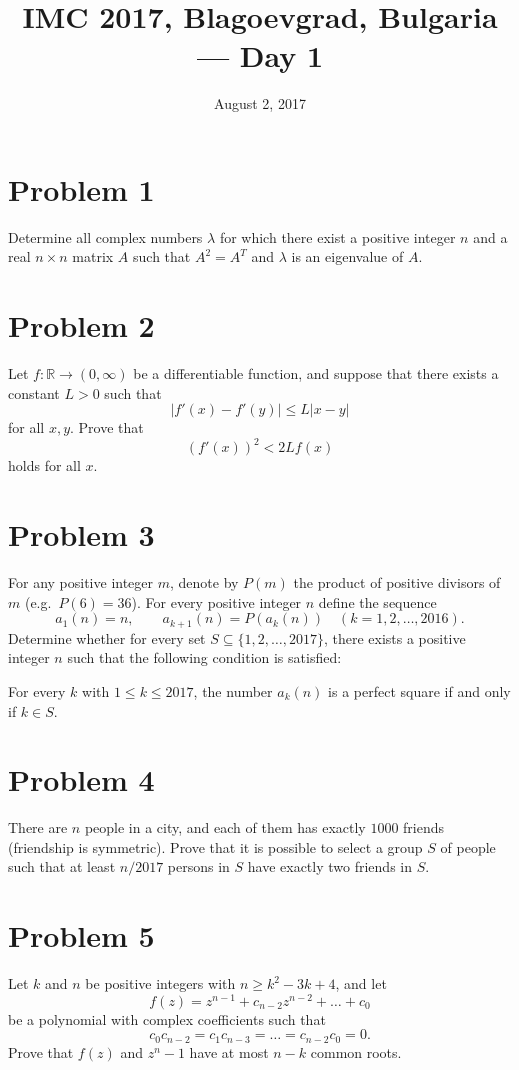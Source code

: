 \documentclass{article}
\title{IMC 2017, Blagoevgrad, Bulgaria --- Day 1}
\date{August 2, 2017}
\begin{document}
\maketitle

\section*{Problem 1}
Determine all complex numbers $\lambda$ for which there exist a positive integer $n$ and a real $n \times n$ matrix $A$ such that $A^2 = A^T$ and $\lambda$ is an eigenvalue of $A$.

\section*{Problem 2}
Let $f : \mathbb{R} \to (0, \infty)$ be a differentiable function, and suppose that there exists a constant $L > 0$ such that
\[ |f'(x) - f'(y)| \le L|x-y| \]
for all $x,y$. Prove that
\[ (f'(x))^2 < 2L f(x) \]
holds for all $x$.

\section*{Problem 3}
For any positive integer $m$, denote by $P(m)$ the product of positive divisors of $m$ (e.g.\ $P(6) = 36$). For every positive integer $n$ define the sequence
\[ a_1(n) = n,\qquad a_{k+1}(n) = P(a_k(n)) \quad (k=1,2,\dots,2016). \]
Determine whether for every set $S \subseteq \{1,2,\dots,2017\}$, there exists a positive integer $n$ such that the following condition is satisfied:

For every $k$ with $1 \le k \le 2017$, the number $a_k(n)$ is a perfect square if and only if $k \in S$.

\section*{Problem 4}
There are $n$ people in a city, and each of them has exactly $1000$ friends (friendship is symmetric). Prove that it is possible to select a group $S$ of people such that at least $n/2017$ persons in $S$ have exactly two friends in $S$.

\section*{Problem 5}
Let $k$ and $n$ be positive integers with $n \ge k^2 - 3k + 4$, and let
\[ f(z) = z^{n-1} + c_{n-2} z^{n-2} + \dots + c_0 \]
be a polynomial with complex coefficients such that
\[ c_0 c_{n-2} = c_1 c_{n-3} = \dots = c_{n-2} c_0 = 0. \]
Prove that $f(z)$ and $z^n - 1$ have at most $n-k$ common roots.
\end{document}
